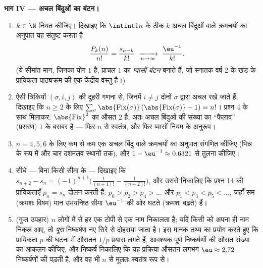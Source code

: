 \begin{problem}
\medskip \noindent\textbf{भाग IV --- अचल बिंदुओं का बंटन।}
\begin{enumerate}[resume]
  \item $k \in \N$ नियत कीजिए। दिखाइए कि $\intint1n$ के ठीक $k$ अचल बिंदुओं
  वाले क्रमचयों का अनुपात यह संतुष्ट करता है
        \[
        \frac{P_k(n)}{n!} = \frac{s_{n-k}}{k!}
        \;\xrightarrow[n \to \infty]{}\; \frac{\eu^{-1}}{k!} .
        \]
        (ये सीमांत मान, जिनका योग $1$ है, प्राचल $1$ का \emph{प्वासों बंटन}
        बनाते हैं, जो स्नातक वर्ष 2 के खंड के प्रायिकता पाठ्यक्रम की एक
        केंद्रीय वस्तु है।)
  \item ऐसी त्रिकियों $(\sigma, i, j)$ की दुहरी गणना से, जिनमें $i \neq j$
  दोनों $\sigma$ द्वारा अचल रखे जाते हैं, दिखाइए कि $n \geq 2$ के लिए
  $\sum_\sigma \abs{\mathrm{Fix}(\sigma)}\, (\abs{\mathrm{Fix}(\sigma)} - 1)
  = n!$। प्रश्न 4 के साथ मिलाकर: $\abs{\mathrm{Fix}}^2$ का औसत $2$ है, अतः
  अचल बिंदुओं की संख्या का ``फैलाव'' (प्रसरण) $1$ के बराबर है --- फिर $n$ से
  स्वतंत्र, और फिर प्वासों नियम के अनुरूप।
  \item $n = 4, 5, 6$ के लिए कम से कम एक अचल बिंदु वाले क्रमचयों का अनुपात
  संगणित कीजिए (भिन्न के रूप में और चार दशमलव स्थानों तक), और $1 - \eu^{-1}
  \approx 0.6321$ से तुलना कीजिए।
  \item सीधे --- बिना किसी सीमा के --- दिखाइए कि $s_{n+2} - s_n =
  (-1)^{n+1}\bigl(\frac1{(n+1)!} - \frac1{(n+2)!}\bigr)$, और उससे निकालिए कि
  प्रश्न 14 की प्रायिकताएँ $p_n = s_n$ दोलन करती हैं: $p_0 > p_2 > p_4 >
  \dots$ और $p_1 < p_3 < p_5 < \dots$, जहाँ सम (क्रमशः विषम) मान उभयनिष्ठ
  सीमा $\eu^{-1}$ की ओर घटते (क्रमशः बढ़ते) हैं।
  \item (गुप्त उपहार) $n$ लोगों में से हर एक टोपी से एक नाम निकालता है; यदि
  किसी को अपना ही नाम निकल आए, तो \emph{पूरा} निष्कर्षण नए सिरे से दोहराया
  जाता है। इस मानक तथ्य का प्रयोग करते हुए कि प्रायिकता $p$ की घटना में औसतन
  $1/p$ प्रयास लगते हैं, आवश्यक पूर्ण निष्कर्षणों की औसत संख्या का आकलन
  कीजिए, और निष्कर्ष निकालिए कि यह प्रक्रिया औसतन लगभग $\eu \approx 2.72$
  निष्कर्षणों की पड़ती है, और वह भी $n$ से मूलतः स्वतंत्र रूप से।
\end{enumerate}


\end{problem}
